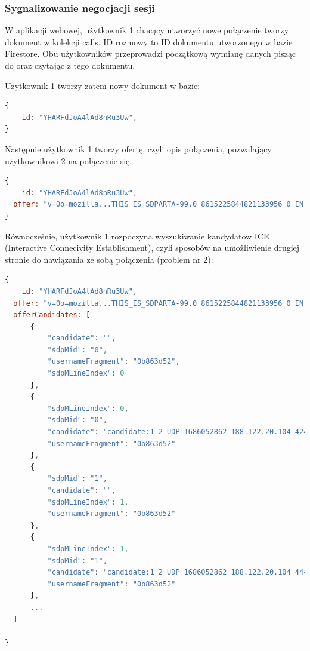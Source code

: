\subsubsection{Sygnalizowanie negocjacji sesji}

W aplikacji webowej, użytkownik 1 chacący utworzyć nowe połączenie tworzy dokument w kolekcji calls. ID rozmowy to ID
dokumentu utworzonego w bazie Firestore. Obu użytkowników przeprowadzi początkową wymianę danych pisząc do oraz czytając
z tego dokumentu.

Użytkownik 1 tworzy zatem nowy dokument w bazie:

\begin{lstlisting}[language=Javascript,label=list:call-doc-1, caption=Dokument połączenia po utworzeniu przez użytkownika 1,
basicstyle=\footnotesize \ttfamily, showtabs=true, tabsize=4]
{
	id: "YHARFdJoA4lAd8nRu3Uw",
}
\end{lstlisting}

Następnie użytkownik 1 tworzy ofertę, czyli opis połączenia, pozwalający użytkownikowi 2 na połączenie się:

\begin{lstlisting}[language=Javascript,label=list:call-doc-2, caption=Dokument połączenia po dodaniu opisu sesji w protokole SDP,
basicstyle=\footnotesize \ttfamily, showtabs=true, tabsize=4]
{
	id: "YHARFdJoA4lAd8nRu3Uw",
  offer: "v=0o=mozilla...THIS_IS_SDPARTA-99.0 8615225844821133956 0 IN IP4 0.0.0.0s=-t=0 0a=fingerprint:sha-256 5F:A8:8A:A5:B8:1D:0C:39:21:93:FA:3A:B2:B7:B6:3F:EF:8A:5D:3C:6E:86:2E:A7:0A:D4:F0:E3:58:E0:E2:7B..."
}
\end{lstlisting}

Równocześnie, użytkownik 1 rozpoczyna wyszukiwanie kandydatów ICE (Interactive Connecivity Establishment), czyli
sposobów na umożliwienie drugiej stronie do nawiązania ze sobą połączenia (problem nr 2):

\begin{lstlisting}[language=Javascript,label=list:call-doc-3, caption=Dokument połączenia po dodaniu kandydatów ICE,
basicstyle=\footnotesize \ttfamily, showtabs=true, tabsize=4]
{
	id: "YHARFdJoA4lAd8nRu3Uw",
  offer: "v=0o=mozilla...THIS_IS_SDPARTA-99.0 8615225844821133956 0 IN IP4 0.0.0.0s=-t=0 0a=fingerprint:sha-256 5F:A8:8A:A5:B8:1D:0C:39:21:93:FA:3A:B2:B7:B6:3F:EF:8A:5D:3C:6E:86:2E:A7:0A:D4:F0:E3:58:E0:E2:7B...",
  offerCandidates: [
      {
          "candidate": "",
          "sdpMid": "0",
          "usernameFragment": "0b863d52",
          "sdpMLineIndex": 0
      },
      {
          "sdpMLineIndex": 0,
          "sdpMid": "0",
          "candidate": "candidate:1 2 UDP 1686052862 188.122.20.104 42436 typ srflx raddr 192.168.1.2 rport 42436",
          "usernameFragment": "0b863d52"
      },
      {
          "sdpMid": "1",
          "candidate": "",
          "sdpMLineIndex": 1,
          "usernameFragment": "0b863d52"
      },
      {
          "sdpMLineIndex": 1,
          "sdpMid": "1",
          "candidate": "candidate:1 2 UDP 1686052862 188.122.20.104 44466 typ srflx raddr 192.168.1.2 rport 44466",
          "usernameFragment": "0b863d52"
      },
      ...
  ]

}
\end{lstlisting}

